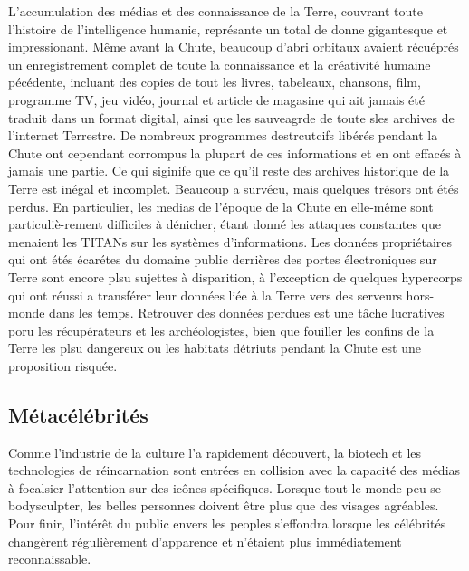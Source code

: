 L'accumulation des médias et des connaissance de la Terre, couvrant toute l'histoire de l'intelligence humanie, représante un total de donne gigantesque et impressionant. Même avant la Chute, beaucoup d'abri orbitaux avaient récuéprés un enregistrement complet de toute la connaissance et la créativité humaine pécédente, incluant des copies de tout les livres, tabeleaux, chansons, film, programme TV, jeu vidéo, journal et article de magasine qui ait jamais été traduit dans un format digital, ainsi que les sauveagrde de toute sles archives de l'internet Terrestre. De nombreux programmes destrcutcifs libérés pendant la Chute ont cependant corrompus la plupart de ces informations et en ont effacés à jamais une partie. Ce qui siginife que ce qu'il reste des archives historique de la Terre est inégal et incomplet. Beaucoup a survécu, mais quelques trésors ont étés perdus. En particulier, les medias de l'époque de la Chute en elle-même sont particuliè-rement difficiles à dénicher, étant donné les attaques constantes que menaient les TITANs sur les systèmes d'informations. Les données propriétaires qui ont étés écarétes du domaine public derrières des portes électroniques sur Terre sont encore plsu sujettes à disparition, à l'exception de quelques hypercorps qui ont réussi a transférer leur données liée à la Terre vers des serveurs hors-monde dans les temps. Retrouver des données perdues est une tâche lucratives poru les récupérateurs et les archéologistes, bien que fouiller les confins de la Terre les plsu dangereux ou les habitats détriuts pendant la Chute est une proposition risquée. 

\subsection{Métacélébrités} \label{sec:metaceleb} 

Comme l'industrie de la culture l'a rapidement découvert, la biotech et les technologies de réincarnation sont entrées en collision avec la capacité des médias à focalsier l'attention sur des icônes spécifiques. Lorsque tout le monde peu se bodysculpter, les belles personnes doivent être plus que des visages agréables. Pour finir, l'intérêt du public envers les peoples s'effondra lorsque les célébrités changèrent régulièrement d'apparence et n'étaient plus immédiatement reconnaissable. 


